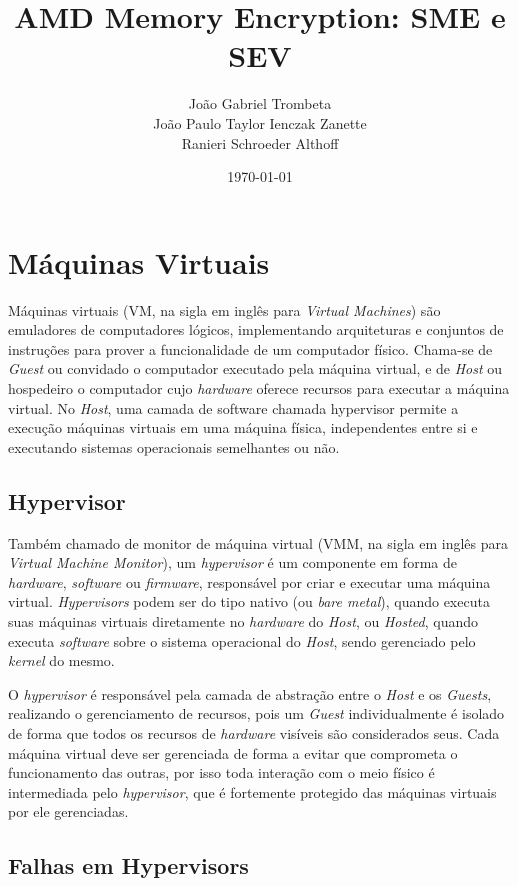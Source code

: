 \documentclass{report}
\title{AMD Memory Encryption: SME e SEV}
\author{João Gabriel Trombeta\\
        João Paulo Taylor Ienczak Zanette\\
        Ranieri Schroeder Althoff}
\date{\today}
\begin{document}
\maketitle

\tableofcontents

\chapter{Máquinas Virtuais}

Máquinas virtuais (VM, na sigla em inglês para \textit{Virtual Machines}) são
emuladores de computadores lógicos, implementando arquiteturas e conjuntos de
instruções para prover a funcionalidade de um computador físico. Chama-se de
\textit{Guest} ou convidado o computador executado pela máquina virtual, e de
\textit{Host} ou hospedeiro o computador cujo \textit{hardware} oferece
recursos para executar a máquina virtual. No \textit{Host}, uma camada de
software chamada hypervisor permite a execução máquinas virtuais em uma máquina
física, independentes entre si e executando sistemas operacionais semelhantes
ou não.

\section{Hypervisor}

Também chamado de monitor de máquina virtual (VMM, na sigla em inglês para
\textit{Virtual Machine Monitor}), um \textit{hypervisor} é um componente em
forma de \textit{hardware}, \textit{software} ou \textit{firmware}, responsável
por criar e executar uma máquina virtual. \textit{Hypervisors} podem ser do
tipo nativo (ou \textit{bare metal}), quando executa suas máquinas virtuais
diretamente no \textit{hardware} do \textit{Host}, ou \textit{Hosted}, quando
executa \textit{software} sobre o sistema operacional do \textit{Host}, sendo
gerenciado pelo \textit{kernel} do mesmo.

O \textit{hypervisor} é responsável pela camada de abstração entre o
\textit{Host} e os \textit{Guests}, realizando o gerenciamento de recursos,
pois um \textit{Guest} individualmente é isolado de forma que todos os recursos
de \textit{hardware} visíveis são considerados seus. Cada máquina virtual deve
ser gerenciada de forma a evitar que comprometa o funcionamento das outras, por
isso toda interação com o meio físico é intermediada pelo \textit{hypervisor},
que é fortemente protegido das máquinas virtuais por ele gerenciadas.

\section{Falhas em Hypervisors}
\end{document}
